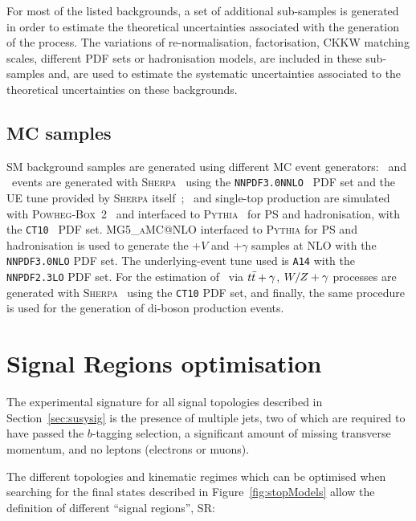 		\noindent For most of the listed backgrounds, a set of additional sub-samples is generated in order to estimate the theoretical uncertainties associated with the generation of the process. The variations of re-normalisation, factorisation, \ac{CKKW} matching scales, different \ac{PDF} sets or hadronisation models, are included in these sub-samples and, are used to estimate the systematic uncertainties associated to the theoretical uncertainties on these backgrounds.

		\subsection{MC samples}
		\label{subsec:mc_samples}

			\ac{SM} background samples are generated using different \ac{MC} event generators: \Zjets\ and \Wjets\ events are generated with \textsc{Sherpa}~\cite{Sherpa} using the \verb+NNPDF3.0NNLO+~\cite{PDFs} \ac{PDF} set and the \ac{UE} tune provided by \textsc{Sherpa} itself~\cite{Sherpa}; \ttbar\ and single-top production are simulated with \textsc{Powheg-Box}~2~\cite{powheg-box} and interfaced to \textsc{Pythia}~\cite{Pythia2006} for \ac{PS} and hadronisation, with the \verb+CT10+~\cite{CT10} \ac{PDF} set. {\scshape MG5\_aMC\/@NLO} interfaced to \textsc{Pythia} for \ac{PS} and hadronisation is used to generate the \ttbar+$V$ and \ttbar+$\gamma$ samples at \ac{NLO} with the \verb+NNPDF3.0NLO+ \ac{PDF} set. The underlying-event tune used is \verb+A14+ with the \verb+NNPDF2.3LO+ \ac{PDF} set. For the estimation of \ttZ\ via $t\bar{t}+\gamma$, $W/Z+\gamma$ processes are generated with \textsc{Sherpa}~\cite{Sherpa} using the \verb+CT10+ \ac{PDF} set, and finally, the same procedure is used for the generation of di-boson production events.


	\section{Signal Regions optimisation}
	\label{sec:SRs}

		The experimental signature for all signal topologies described in Section~\ref{sec:susysig} is the presence of multiple jets, two of which are required to have passed the $b$-tagging selection, a significant amount of missing transverse momentum, and no leptons (electrons or muons).

		The different topologies and kinematic regimes which can be optimised when searching for the final states described in Figure~\ref{fig:stopModels} allow the definition of different ``signal regions'', \ac{SR}: 
		
